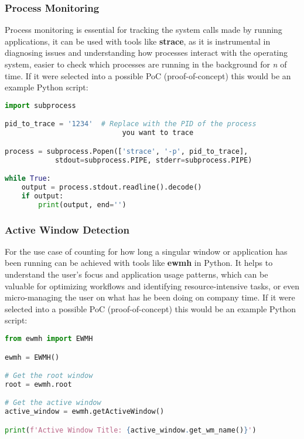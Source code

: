 \documentclass{VUMIFPSmagistrinis}
\begin{document}
\subsubsection{Process Monitoring}

Process monitoring is essential for tracking the system calls made by running applications, it can be used with tools like \textbf{strace}, as it is instrumental in diagnosing issues and understanding how processes interact with the operating system, easier to check which processes are running in the background for \textit{n} of time. If it were selected into a possible PoC (proof-of-concept) this would be an example Python script:
\begin{lstlisting}[language=Python]
import subprocess

pid_to_trace = '1234'  # Replace with the PID of the process 
                            you want to trace

process = subprocess.Popen(['strace', '-p', pid_to_trace], 
            stdout=subprocess.PIPE, stderr=subprocess.PIPE)

while True:
    output = process.stdout.readline().decode()
    if output:
        print(output, end='')
\end{lstlisting}

\subsubsection{Active Window Detection}
For the use case of counting for how long a singular window or application has been running can be achieved with tools like \textbf{ewmh} in Python. It helps to understand the user's focus and application usage patterns, which can be valuable for optimizing workflows and identifying resource-intensive tasks, or even micro-managing the user on what has he been doing on company time. If it were selected into a possible PoC (proof-of-concept) this would be an example Python script:
\begin{lstlisting}[language=Python]
from ewmh import EWMH

ewmh = EWMH()

# Get the root window
root = ewmh.root

# Get the active window
active_window = ewmh.getActiveWindow()

print(f'Active Window Title: {active_window.get_wm_name()}')
\end{lstlisting}
\end{document}
